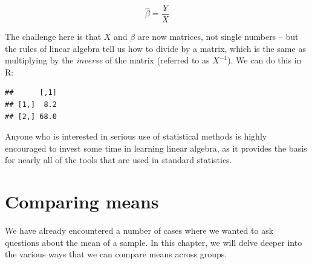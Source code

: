 \documentclass[12pt,]{book}
\newenvironment{Shaded}{\begin{snugshade}}{\end{snugshade}}
\newcommand{\CommentTok}[1]{\textcolor[rgb]{0.56,0.35,0.01}{\textit{#1}}}
\newcommand{\DataTypeTok}[1]{\textcolor[rgb]{0.13,0.29,0.53}{#1}}
\newcommand{\DecValTok}[1]{\textcolor[rgb]{0.00,0.00,0.81}{#1}}
\newcommand{\KeywordTok}[1]{\textcolor[rgb]{0.13,0.29,0.53}{\textbf{#1}}}
\newcommand{\NormalTok}[1]{#1}
\newcommand{\OperatorTok}[1]{\textcolor[rgb]{0.81,0.36,0.00}{\textbf{#1}}}
\newcommand{\StringTok}[1]{\textcolor[rgb]{0.31,0.60,0.02}{#1}}
\theoremstyle{definition}
\theoremstyle{definition}
\theoremstyle{definition}
\theoremstyle{remark}
\begin{document}
\[
\hat{\beta} = \frac{Y}{X}
\]

The challenge here is that \(X\) and \(\beta\) are now matrices, not single numbers -- but the rules of linear algebra tell us how to divide by a matrix, which is the same as multiplying by the \emph{inverse} of the matrix (referred to as \(X^{-1}\)). We can do this in R:

\begin{Shaded}
\end{Shaded}

\begin{verbatim}
##      [,1]
## [1,]  8.2
## [2,] 68.0
\end{verbatim}

Anyone who is interested in serious use of statistical methods is highly encouraged to invest some time in learning linear algebra, as it provides the basis for nearly all of the tools that are used in standard statistics.

\hypertarget{comparing-means}{%
\chapter{Comparing means}\label{comparing-means}}

We have already encountered a number of cases where we wanted to ask questions about the mean of a sample. In this chapter, we will delve deeper into the various ways that we can compare means across groups.
\end{document}
